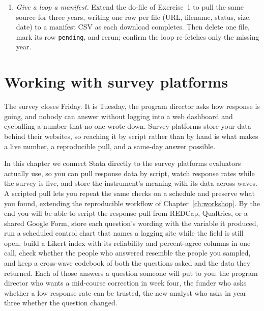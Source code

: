 \documentclass[
    a4paper,
    fontsize=10pt,
    twoside=true,
    numbers=noenddot,
]{kaobook}
\begin{document}
\begin{enumerate}
    \texttt{rename price price\_usd}, \texttt{cars\_2020.csv} into a
    \texttt{raw/} folder. Write a one-row map CSV
    (\texttt{price\_usd,price,2020,}) outside that folder, run
    \texttt{combineall using "built/cars\_panel", cmethod(append)
    directory("raw/") map("map.csv")}, then \texttt{use} the result
    and confirm from the harmonization table and
    \texttt{char list price[source]} that the two years stacked into
    a single \texttt{price} column that records its 2020 provenance.
  \item \emph{Give a loop a manifest.} Extend the do-file of
    Exercise~1 to pull the same source for three years, writing one
    row per file (URL, filename, status, size, date) to a manifest
    CSV as each download completes. Then delete one file, mark its
    row \texttt{pending}, and rerun; confirm the loop re-fetches
    only the missing year.
\end{enumerate}

\chapter{Working with survey platforms}\label{ch:surveys}

The survey closes Friday. It is Tuesday, the program director asks how response is going, and nobody can answer without logging into a web dashboard and eyeballing a number that no one wrote down. Survey platforms store your data behind their websites, so reaching it by script rather than by hand is what makes a live number, a reproducible pull, and a same-day answer possible.

In this chapter we connect Stata directly to the survey platforms evaluators actually use, so you can pull response data by script, watch response rates while the survey is live, and store the instrument's meaning with its data across waves. A scripted pull lets you repeat the same checks on a schedule and preserve what you found, extending the reproducible workflow of Chapter~\ref{ch:workshop}. By the end you will be able to script the response pull from REDCap, Qualtrics, or a shared Google Form, store each question's wording with the variable it produced, run a scheduled control chart that names a lagging site while the field is still open, build a Likert index with its reliability and percent-agree columns in one call, check whether the people who answered resemble the people you sampled, and keep a cross-wave codebook of both the questions asked and the data they returned. Each of those answers a question someone will put to you: the program director who wants a mid-course correction in week four, the funder who asks whether a low response rate can be trusted, the new analyst who asks in year three whether the question changed.
\end{document}
